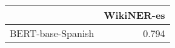 \begin{tabular}{lr}
\toprule
 & WikiNER-es \\
\midrule
BERT-base-Spanish & 0.794 \\
\bottomrule
\end{tabular}
